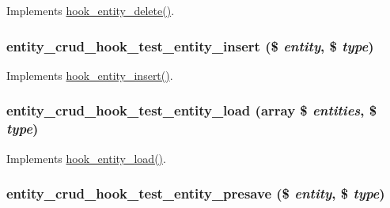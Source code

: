 \label{entity__crud__hook__test_8module_a85097a52cb0cfd73f9b0d9ad599d282d}
Implements \hyperlink{group__hooks_gac329b7f9d18e7fbccb6057e6f4bc4cb9}{hook\_\-entity\_\-delete()}. \hypertarget{entity__crud__hook__test_8module_a3519aa24e8f9a1c5fa48a0cb61e5ba14}{
\subsubsection[{entity\_\-crud\_\-hook\_\-test\_\-entity\_\-insert}]{\setlength{\rightskip}{0pt plus 5cm}entity\_\-crud\_\-hook\_\-test\_\-entity\_\-insert (\$ {\em entity}, \/  \$ {\em type})}}
\label{entity__crud__hook__test_8module_a3519aa24e8f9a1c5fa48a0cb61e5ba14}
Implements \hyperlink{group__hooks_ga38882255a4252e0e87d77ecd9c75a0dd}{hook\_\-entity\_\-insert()}. \hypertarget{entity__crud__hook__test_8module_afc2f5463fb4fff838c2dac32bfd6e819}{
\subsubsection[{entity\_\-crud\_\-hook\_\-test\_\-entity\_\-load}]{\setlength{\rightskip}{0pt plus 5cm}entity\_\-crud\_\-hook\_\-test\_\-entity\_\-load (array \$ {\em entities}, \/  \$ {\em type})}}
\label{entity__crud__hook__test_8module_afc2f5463fb4fff838c2dac32bfd6e819}
Implements \hyperlink{group__hooks_ga1f594647c8cbb27f75b77cc4118da8d6}{hook\_\-entity\_\-load()}. \hypertarget{entity__crud__hook__test_8module_a2decbfb4cd256d3e883d3cc548e2af34}{
\subsubsection[{entity\_\-crud\_\-hook\_\-test\_\-entity\_\-presave}]{\setlength{\rightskip}{0pt plus 5cm}entity\_\-crud\_\-hook\_\-test\_\-entity\_\-presave (\$ {\em entity}, \/  \$ {\em type})}}
